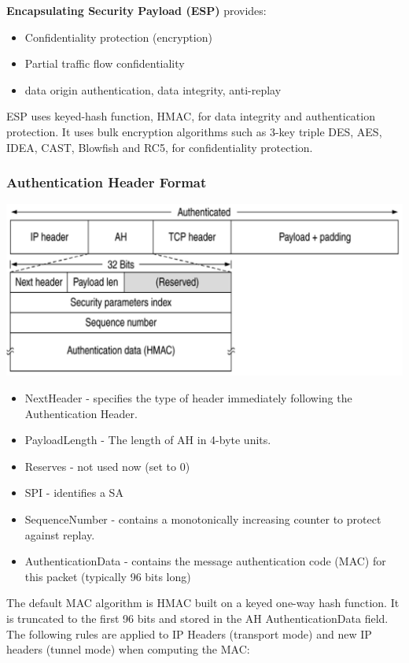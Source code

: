 \documentclass{article}
\begin{document}
\textbf{Encapsulating Security Payload (ESP)} provides:
\begin{itemize}
  \item Confidentiality protection (encryption)
  \item Partial traffic flow confidentiality
  \item data origin authentication, data integrity, anti-replay
\end{itemize}
ESP uses keyed-hash function, HMAC, for data integrity and authentication protection. It uses bulk encryption algorithms such as 3-key triple DES, AES, IDEA, CAST, Blowfish and RC5, for confidentiality protection.

\subsubsection{Authentication Header Format}
\begin{center}
  \includegraphics[scale=0.6]{ah-format.png}
\end{center}
\begin{itemize}
  \item NextHeader - specifies the type of header immediately following the Authentication Header.
  \item PayloadLength - The length of AH in 4-byte units.
  \item Reserves - not used now (set to 0)
  \item SPI - identifies a SA
  \item SequenceNumber - contains a monotonically increasing counter to protect against replay.
  \item AuthenticationData - contains the message authentication code (MAC) for this packet (typically 96 bits long)
\end{itemize}
The default MAC algorithm is HMAC built on a keyed one-way hash function. It is truncated to the first 96 bits and stored in the AH AuthenticationData field. The following rules are applied to IP Headers (transport mode) and new IP headers (tunnel mode) when computing the MAC:
\end{document}
